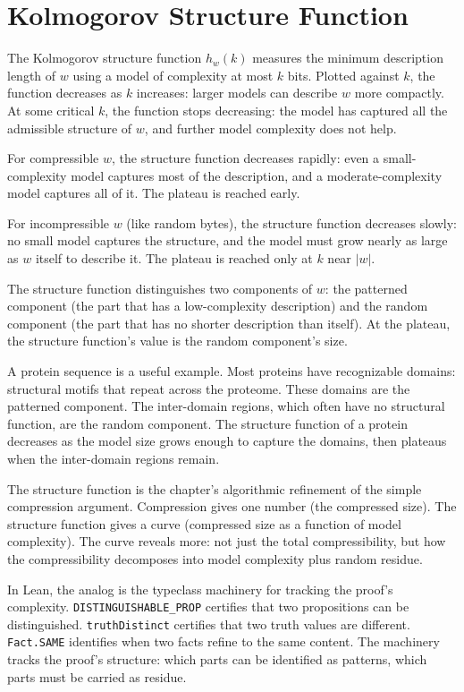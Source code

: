 \section{Kolmogorov Structure Function}
\label{se:kolmogorov-structure-function}

The Kolmogorov structure function $h_w(k)$ measures the minimum
description length of $w$ using a model of complexity at most $k$
bits. Plotted against $k$, the function decreases as $k$ increases:
larger models can describe $w$ more compactly. At some critical $k$,
the function stops decreasing: the model has captured all the
admissible structure of $w$, and further model complexity does not
help.

For compressible $w$, the structure function decreases rapidly:
even a small-complexity model captures most of the description, and
a moderate-complexity model captures all of it. The plateau is
reached early.

For incompressible $w$ (like random bytes), the structure function
decreases slowly: no small model captures the structure, and the
model must grow nearly as large as $w$ itself to describe it. The
plateau is reached only at $k$ near $|w|$.

The structure function distinguishes two components of $w$: the
patterned component (the part that has a low-complexity description)
and the random component (the part that has no shorter description
than itself). At the plateau, the structure function's value is
the random component's size.

A protein sequence is a useful example. Most proteins have
recognizable domains: structural motifs that repeat across the
proteome. These domains are the patterned component. The
inter-domain regions, which often have no structural function, are
the random component. The structure function of a protein
decreases as the model size grows enough to capture the domains,
then plateaus when the inter-domain regions remain.

The structure function is the chapter's algorithmic refinement of
the simple compression argument. Compression gives one number (the
compressed size). The structure function gives a curve (compressed
size as a function of model complexity). The curve reveals more:
not just the total compressibility, but how the compressibility
decomposes into model complexity plus random residue.

In Lean, the analog is the typeclass machinery for tracking the
proof's complexity. \texttt{DISTINGUISHABLE\_PROP} certifies that
two propositions can be distinguished. \texttt{truthDistinct}
certifies that two truth values are different. \texttt{Fact.SAME}
identifies when two facts refine to the same content. The
machinery tracks the proof's structure: which parts can be
identified as patterns, which parts must be carried as residue.

